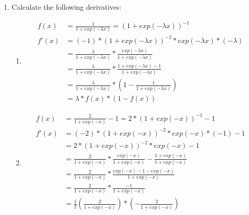 \documentclass{article}
\begin{document}
\begin{enumerate}
\begin{enumerate}
\begin{center}
\begin{minipage}{8cm}
                \end{minipage}
                \end{center}
        \end{enumerate}
        \newpage
    \item Calculate the following derivatives:
        \begin{enumerate}
            \item
                \begin{align*}
                    f(x) &= \frac{1}{1+exp(-\lambda x)}  = (1+exp(-\lambda
                    x))^{-1}\\
                    f'(x) &= (-1)*(1+exp(-\lambda x))^{-2}*exp(-\lambda
                    x)*(-\lambda)\\
                    &= \frac{\lambda}{1+exp(-\lambda x)}*\frac{exp(-\lambda
                x)}{1+exp(-\lambda x)}\\
                &= \frac{\lambda}{1+exp(-\lambda x)}*\frac{1+exp(-\lambda
            x)-1}{1+exp(-\lambda x)}\\
            &= \frac{\lambda}{1+exp(-\lambda x)}*(1-\frac{ 1}{1+exp(-\lambda
        x)})\\
        &= \lambda*f(x)*(1-f(x))
    \end{align*}
\item
    \begin{align*}
        f(x) &= \frac{2}{1+exp(-x)} -1  = 2*(1+exp(-x))^{-1}-1\\
        f'(x) &= (-2)*(1+exp(- x))^{-2}*exp(-x)*(-1)-1\\
              &= 2*(1+exp(- x))^{-2}*exp(-x) -1\\
              &= \frac{2}{1+exp(-x)}*\frac{exp(-x)}{1+exp(- x)}-\frac{1+exp(- x)}{1+exp(- x)}\\
              &= \frac{2}{1+exp(-x)}*\frac{exp(-x)-1-exp(- x)}{1+exp(- x)}\\
              &= \frac{2}{1+exp(-x)}*\frac{-1}{1+exp(- x)}\\
              &= \frac{1}{2}(\frac{2}{1+exp(-x)})*(-\frac{2}{1+exp(-x)})\\

\end{align*}
\end{enumerate}
\end{enumerate}
\end{document}
